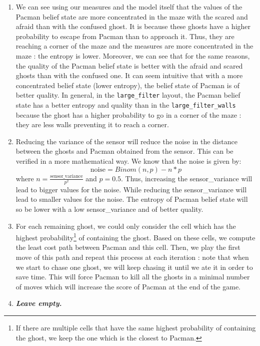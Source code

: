 \documentclass{article}
\begin{document}
\begin{enumerate}[label=\alph*.,leftmargin=*]
    \item We can see using our measures and the model itself that the values of the Pacman belief state are more concentrated in the maze with the scared and afraid than with the confused ghost. It is because these ghosts have a higher probability to escape from Pacman than to approach it. Thus, they are reaching a corner of the maze and the measures are more concentrated in the maze : the entropy is lower.
    Moreover, we can see that for the same reasons, the quality of the Pacman belief state is better with the afraid and scared ghosts than with the confused one. It can seem intuitive that with a more concentrated belief state (lower entropy), the belief state of Pacman is of better quality. In general, in the \texttt{large\_filter} layout, the Pacman belief state has a better entropy and quality than in the \texttt{large\_filter\_walls} because the ghost has a higher probability to go in a corner of the maze : they are less walls preventing it to reach a corner.
    \item Reducing the variance of the sensor will reduce the noise in the distance between the ghosts and Pacman obtained from the sensor. This can be verified in a more mathematical way. We know that the noise is given by: $$\text{noise} = Binom(n, p) - n * p$$
    where $n = \frac{\text{sensor\_variance}}{p^2}$ and $p = 0.5$. Thus, increasing the sensor\_variance will lead to bigger values for the noise. While reducing the sensor\_variance will lead to smaller values for the noise. The entropy of Pacman belief state will so be lower with a low sensor\_variance and of better quality.
    
    \item For each remaining ghost, we could only consider the cell which has the highest probability\footnote{If there are multiple cells that have the same highest probability of containing the ghost, we keep the one which is the closest to Pacman.} of containing the ghost. Based on these cells, we compute the least cost path between Pacman and this cell. Then, we play the first move of this path and repeat this process at each iteration : note that when we start to chase one ghost, we will keep chasing it until we ate it in order to save time. This will force Pacman to kill all the ghosts in a minimal number of moves which will increase the score of Pacman at the end of the game.
    \item \textbf{\textit{Leave empty.}}
\end{enumerate}

\end{document}
